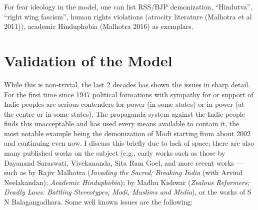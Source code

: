 For fear ideology in the model, one can list RSS/BJP demonization, “Hindutva”, “right wing fascism”, human rights violations (atrocity literature (Malhotra et al 2011)), academic Hinduphobia (Malhotra 2016) as exemplars.

\section*{Validation of the Model}

While this is non-trivial, the last 2 decades has shown the issues in sharp detail. For the first time since 1947 political formations with sympathy for or support of Indic peoples are serious contenders for power (in some states) or in power (at the centre or in some states). The propaganda system against the Indic people finds this unacceptable and has used every means available to contain it, the most notable example being the demonization of Modi starting from about 2002 and continuing even now. I discuss this briefly due to lack of space; there are also many published works on the subject (e.g., early works such as those by Dayanand Saraswati, Vivekananda, Sita Ram Goel, and more recent works —such as by Rajiv Malhotra  ({\sl Invading the Sacred; Breaking India} (with Arvind Neelakandan); {\sl Academic Hinduphobia}); by Madhu Kishwar ({\sl Zealous Reformers; Deadly Laws: Battling Stereotypes; Modi, Muslims and Media}), or the works of S N Balagangadhara. Some well known issues are the following:
